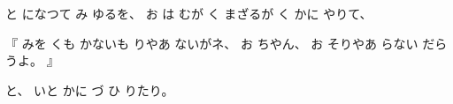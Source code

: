 %
と
になつて
み
ゆるを、
%
お
は
むが
く
まざるが
く
かに
やりて、

%
『
みを
くも
かないも
りやあ
ないがネ、
%
お
ちやん、
%
お
そりやあ
らない
だらうよ。
』

%
と、
%
いと
かに
づ
ひ
りたり。
